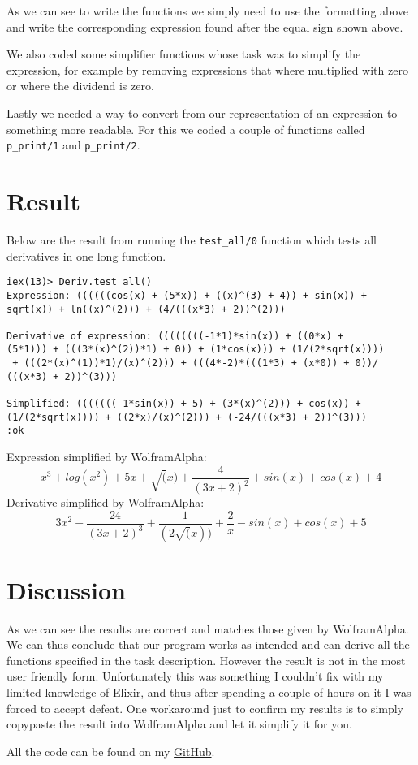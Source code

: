 \documentclass[a4paper,11pt]{article}
\newenvironment{code}{\captionsetup{type=listing}}{}
\begin{document}
As we can see to write the functions we simply need to use the formatting above and write the corresponding expression 
found after the equal sign shown above.

We also coded some simplifier functions whose task was to simplify the expression, for example by removing expressions 
that where multiplied with zero or where the dividend is zero. 

Lastly we needed a way to convert from our representation of an expression to something more readable. For this we coded a 
couple of functions called {\tt p\_print/1} and {\tt p\_print/2}.

\section*{Result}
Below are the result from running the {\tt test\_all/0} function which tests all derivatives in one long function.
\begin{code}
\begin{verbatim}
iex(13)> Deriv.test_all()  
Expression: ((((((cos(x) + (5*x)) + ((x)^(3) + 4)) + sin(x)) + 
sqrt(x)) + ln((x)^(2))) + (4/(((x*3) + 2))^(2)))

Derivative of expression: ((((((((-1*1)*sin(x)) + ((0*x) + 
(5*1))) + (((3*(x)^(2))*1) + 0)) + (1*cos(x))) + (1/(2*sqrt(x))))
 + (((2*(x)^(1))*1)/(x)^(2))) + (((4*-2)*(((1*3) + (x*0)) + 0))/
(((x*3) + 2))^(3)))

Simplified: (((((((-1*sin(x)) + 5) + (3*(x)^(2))) + cos(x)) + 
(1/(2*sqrt(x)))) + ((2*x)/(x)^(2))) + (-24/(((x*3) + 2))^(3)))
:ok
\end{verbatim}
\end{code}
Expression simplified by WolframAlpha: 
\[x^3 + log(x^2) + 5x + \sqrt(x) + \frac{4}{(3 x + 2)^2} + sin(x) + cos(x) + 4\]
Derivative simplified by WolframAlpha: 
\[3x^2 - \frac{24}{(3 x + 2)^3} + \frac{1}{(2 \sqrt(x))} + \frac{2}{x} - sin(x) + cos(x) + 5 \]

\section*{Discussion}
As we can see the results are correct and matches those given by WolframAlpha. We can thus conclude that our program 
works as intended and can derive all the functions specified in the task description. However the result is not in the 
most user friendly form. Unfortunately this was something I couldn't fix with my limited knowledge of Elixir, and thus after
spending a couple of hours on it I was forced to accept defeat. One workaround just to confirm my results is to simply 
copypaste the result into WolframAlpha and let it simplify it for you. 

All the code can be found on my 
\href{https://github.com/adrian-jonsson-sjoedin/ID1019-Programming-II/tree/main/Task1_Solution}{GitHub}.
\end{document}
